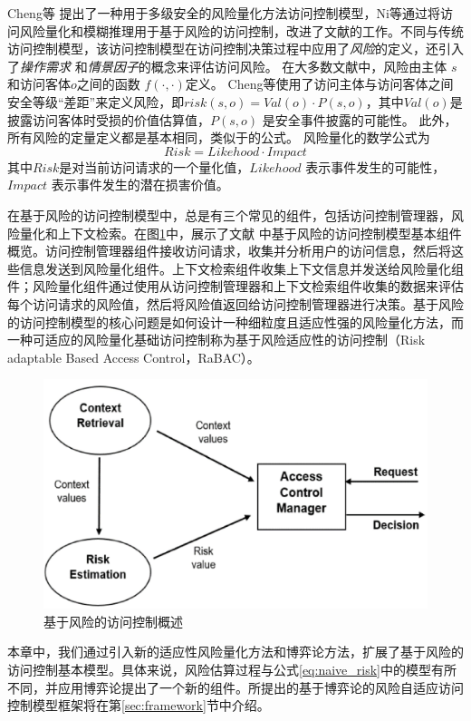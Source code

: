 Cheng等\cite{cheng2007fuzzy} 提出了一种用于多级安全的风险量化方法访问控制模型，Ni等\cite{ni2010risk}通过将访问风险量化和模糊推理用于基于风险的访问控制，改进了文献\cite{cheng2007fuzzy}的工作。不同与传统访问控制模型，该访问控制模型在访问控制决策过程中应用了\emph{风险}的定义，还引入了\emph{操作需求} 和\emph{情景因子}的概念来评估访问风险。 在大多数文献\cite{cheng2007fuzzy,ni2010risk,kandala2011attribute,bijon2012risk}中，风险由主体 $s$和访问客体$o$之间的函数 $f(\cdot, \cdot)$定义。 Cheng等\cite{cheng2007fuzzy}使用了访问主体与访问客体之间安全等级“差距”来定义风险，即$risk(s,o)=Val(o) \cdot P(s,o)$，其中$Val(o)$是披露访问客体时受损的价值估算值，$P(s,o)$ 是安全事件披露的可能性。 此外，所有风险的定量定义都是基本相同，类似于\cite{cheng2007fuzzy}的公式。 风险量化的数学公式为
\begin{equation}\label{eq:naive_risk}
Risk = Likehood \cdot Impact
\end{equation}
其中$Risk$是对当前访问请求的一个量化值，$Likehood$ 表示事件发生的可能性，$Impact$ 表示事件发生的潜在损害价值。


在基于风险的访问控制模型中，总是有三个常见的组件，包括访问控制管理器，风险量化和上下文检索。在图\ref{fig:rbac}中，展示了文献 \cite{diep2007enforcing}中基于风险的访问控制模型基本组件概览。访问控制管理器组件接收访问请求，收集并分析用户的访问信息，然后将这些信息发送到风险量化组件。上下文检索组件收集上下文信息并发送给风险量化组件；风险量化组件通过使用从访问控制管理器和上下文检索组件收集的数据来评估每个访问请求的风险值，然后将风险值返回给访问控制管理器进行决策。基于风险的访问控制模型的核心问题是如何设计一种细粒度且适应性强的风险量化方法，而一种可适应的风险量化基础访问控制称为基于风险适应性的访问控制（Risk adaptable Based Access Control，RaBAC）。

\begin{figure}[htb]
	\centering
	\includegraphics[width=.6\textwidth]{./figures/fig-rbac.jpg}
	\caption{基于风险的访问控制概述\cite{diep2007enforcing}}\label{fig:rbac}
\end{figure}

本章中，我们通过引入新的适应性风险量化方法和博弈论方法，扩展了基于风险的访问控制基本模型。具体来说，风险估算过程与公式\ref{eq:naive_risk}中的模型有所不同，并应用博弈论提出了一个新的组件。所提出的基于博弈论的风险自适应访问控制模型框架将在第\ref{sec:framework}节中介绍。


